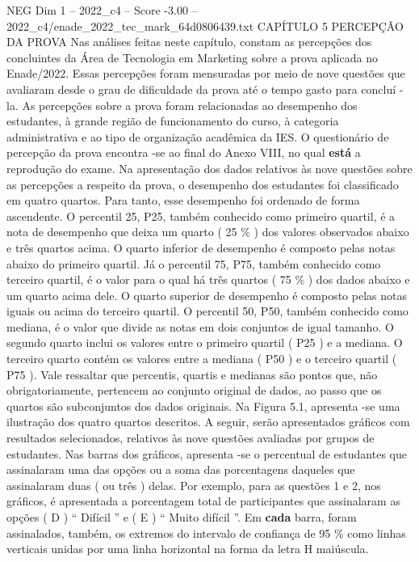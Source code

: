 \begin{textsample}{NEG Dim 1 – 2022\_c4 – Score -3.00 – 2022\_c4/enade\_2022\_tec\_mark\_64d0806439.txt}  \label{ex:f1_neg_180}
CAPÍTULO 5 PERCEPÇÃO DA PROVA Nas análises feitas neste capítulo, constam as percepções dos concluintes da Área de Tecnologia em Marketing sobre a prova aplicada no Enade/2022.
Essas percepções foram mensuradas por meio de nove questões que avaliaram desde o grau de dificuldade da prova até o tempo gasto para concluí -la.
As percepções sobre a prova foram relacionadas ao desempenho dos estudantes, à grande região de funcionamento do curso, à categoria administrativa e ao tipo de organização acadêmica da IES.
O questionário de percepção da prova encontra -se ao final do Anexo VIII, no qual \textbf{está} a reprodução do exame.
Na apresentação dos dados relativos às nove questões sobre as percepções a respeito da prova, o desempenho dos estudantes foi classificado em quatro quartos.
Para tanto, esse desempenho foi ordenado de forma ascendente.
O percentil 25, P25, também conhecido como primeiro quartil, é a nota de desempenho que deixa um quarto ( 25 \% ) dos valores observados abaixo e três quartos acima.
O quarto inferior de desempenho é composto pelas notas abaixo do primeiro quartil.
Já o percentil 75, P75, também conhecido como terceiro quartil, é o valor para o qual há três quartos ( 75 \% ) dos dados abaixo e um quarto acima dele.
O quarto superior de desempenho é composto pelas notas iguais ou acima do terceiro quartil.
O percentil 50, P50, também conhecido como mediana, é o valor que divide as notas em dois conjuntos de igual tamanho.
O segundo quarto inclui os valores entre o primeiro quartil ( P25 ) e a mediana.
O terceiro quarto contém os valores entre a mediana ( P50 ) e o terceiro quartil ( P75 ).
Vale ressaltar que percentis, quartis e medianas são pontos que, não obrigatoriamente, pertencem ao conjunto original de dados, ao passo que os quartos são subconjuntos dos dados originais.
Na Figura 5.1, apresenta -se uma ilustração dos quatro quartos descritos.
A seguir, serão apresentados gráficos com resultados selecionados, relativos às nove questões avaliadas por grupos de estudantes.
Nas barras dos gráficos, apresenta -se o percentual de estudantes que assinalaram uma das opções ou a soma das porcentagens daqueles que assinalaram duas ( ou três ) delas.
Por exemplo, para as questões 1 e 2, nos gráficos, é apresentada a porcentagem total de participantes que assinalaram as opções ( D ) “ Difícil ” e ( E ) “ Muito difícil ”.
Em \textbf{cada} barra, foram assinalados, também, os extremos do intervalo de confiança de 95 \% como linhas verticais unidas por uma linha horizontal na forma da letra H maiúscula.

\end{textsample}
